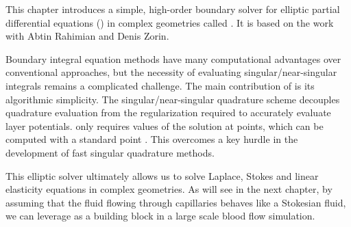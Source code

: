 
This chapter introduces a simple, high-order boundary solver for elliptic partial differential equations (\pdes) in \threed complex geometries called \qbkix.
It is based on the work \cite{morse2020robust} with Abtin Rahimian and Denis Zorin.

Boundary integral equation methods have many computational advantages over conventional approaches, but the necessity of evaluating singular/near-singular integrals remains a complicated challenge.
The main contribution of \qbkix is its algorithmic simplicity.
The singular/near-singular quadrature scheme decouples quadrature evaluation from the regularization required to accurately evaluate layer potentials.
\qbkix only requires values of the solution at points, which can be computed with a standard point \fmm.
This overcomes a key hurdle in the development of fast singular quadrature methods.

This elliptic \pde solver ultimately allows us to solve Laplace, Stokes and linear elasticity equations in complex geometries.
As will see in the next chapter, by assuming that the fluid flowing through capillaries behaves like a Stokesian fluid, we can leverage \qbkix as a building block in a large scale blood flow simulation.








